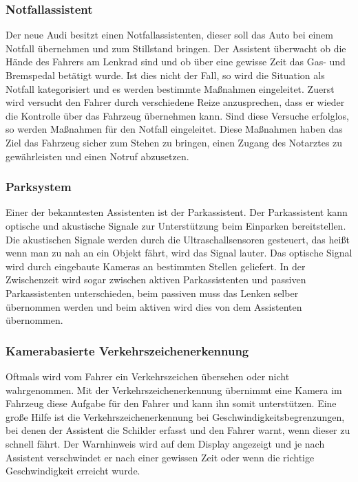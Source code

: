         \subsubsection{Notfallassistent}
        Der neue Audi besitzt einen Notfallassistenten, dieser soll das Auto bei einem Notfall übernehmen 
        und zum Stillstand bringen. Der Assistent überwacht ob die Hände des Fahrers am Lenkrad sind und 
        ob über eine gewisse Zeit das Gas- und Bremspedal betätigt wurde. Ist dies nicht der Fall, so 
        wird die Situation als Notfall kategorisiert und es werden bestimmte Maßnahmen eingeleitet.
        Zuerst wird versucht den Fahrer durch verschiedene Reize anzusprechen, dass er wieder die Kontrolle 
        über das Fahrzeug übernehmen kann. Sind diese Versuche erfolglos, so werden Maßnahmen für den 
        Notfall eingeleitet. Diese Maßnahmen haben das Ziel das Fahrzeug sicher zum Stehen zu bringen, einen Zugang des 
        Notarztes zu gewährleisten und einen Notruf abzusetzen.
        \cite{Audi.PB1}
        
        \subsubsection{Parksystem}
        Einer der bekanntesten Assistenten ist der Parkassistent. Der Parkassistent kann optische und 
        akustische Signale zur Unterstützung beim Einparken bereitstellen. Die akustischen Signale werden
        durch die Ultraschallsensoren gesteuert, das heißt wenn man zu nah an ein Objekt fährt, wird das Signal
        lauter. Das optische Signal wird durch eingebaute Kameras an bestimmten Stellen geliefert.
        In der Zwischenzeit wird sogar zwischen aktiven Parkassistenten und passiven Parkassistenten 
        unterschieden, beim passiven muss das Lenken selber übernommen werden und beim aktiven wird 
        dies von dem Assistenten übernommen.
        \cite{parkassi.PB1} \cite{assistenzsysteme.PB1} \cite{parkassi.PB2}
        
        \subsubsection{Kamerabasierte Verkehrszeichenerkennung}
        Oftmals wird vom Fahrer ein Verkehrszeichen übersehen oder nicht wahrgenommen. Mit der Verkehrszeichenerkennung 
        übernimmt eine Kamera im Fahrzeug diese Aufgabe für den Fahrer und kann ihn somit unterstützen.
        Eine große Hilfe ist die Verkehrszeichenerkennung bei Geschwindigkeitsbegrenzungen, bei denen der 
        Assistent die Schilder erfasst und den Fahrer warnt, wenn dieser zu schnell fährt. Der Warnhinweis 
        wird auf dem Display angezeigt und je nach Assistent verschwindet er nach einer gewissen Zeit oder 
        wenn die richtige Geschwindigkeit erreicht wurde.
        \cite{assistenzsysteme.PB1} \cite{verkehrszeichenerk.PB1} \cite{verkehrszeichenerk.PB2}
        
